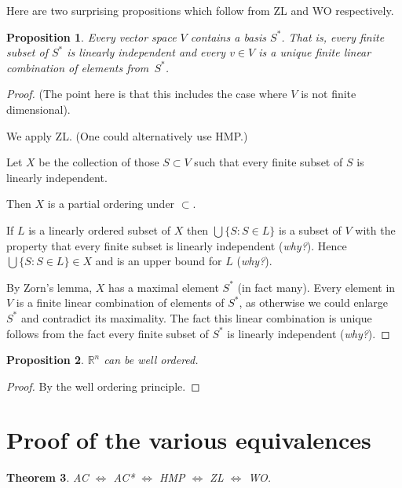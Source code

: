 \documentclass[a4paper]{amsart}
\theoremstyle{plain}
\newtheorem{theorem}{Theorem}[section]
\newtheorem{proposition}[theorem]{Proposition}
\theoremstyle{definition}
\theoremstyle{remark}
\begin{document}
Here are two surprising propositions which follow from ZL and WO respectively.



\begin{proposition} Every vector space $ V $ contains a basis $ S^* $.  That is,  every finite subset of $ S^* $ is linearly independent and every $v\in V $ is a unique finite linear combination of elements from~$ S^* $. 
\end{proposition}

\begin{proof}  (The point here is that this includes the case where $ V $  is not finite dimensional).

We apply ZL. (One could alternatively use HMP.)

Let $ X $ be the collection  of those $ S\subset V $ such that every finite subset of $ S $ is linearly independent.   

Then $ X $  is a partial ordering under $ \subset $.  

If $ L $ is a linearly ordered subset of $ X $ then 
$ \bigcup \{ S : S \in L \} $ is a subset of $ V $ with the property that every finite subset   is linearly independent (\emph{why?}).    Hence $ \bigcup \{ S : S \in L \} \in X$ and is an upper bound for $ L $ (\emph{why?}).

By Zorn's lemma, $ X $ has a maximal element $ S^* $  (in fact many).  Every element in $ V $ is a finite linear combination of elements of $ S^* $, as otherwise we could enlarge $ S^* $ and contradict its maximality. The fact this linear combination is unique follows from the fact every finite subset of $ S^* $ is linearly independent (\emph{why?}).  
\end{proof} 

\begin{proposition} $ \mathbb{R}^n $ can be well ordered.
\end{proposition}

\begin{proof} By the well ordering principle.
\end{proof}


\section{\textbf{Proof of the various equivalences}}

\begin{theorem} AC $  \Longleftrightarrow$  AC* $ \Longleftrightarrow$  HMP $ \Longleftrightarrow$  ZL $ \Longleftrightarrow$  WO.
\end{theorem}
\end{document}
